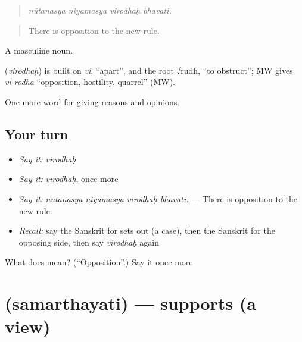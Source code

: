 \begin{quote}
   
\end{quote}

\begin{quote}
\emph{nūtanasya niyamasya virodhaḥ bhavati.}
\end{quote}

\begin{quote}
There is opposition to the new rule.
\end{quote}

A masculine noun.

\begin{cousinweb}
\textbf{} (\emph{virodhaḥ}) is built on \emph{vi}, \textquotedblleft{}apart\textquotedblright{}, and the root √rudh, \textquotedblleft{}to obstruct\textquotedblright{}; MW gives \emph{vi-rodha} \textquotedblleft{}opposition, hostility, quarrel\textquotedblright{} (MW).
\end{cousinweb}

\begin{grammarlens}[title={What you've built}]
One more word for giving reasons and opinions.
\end{grammarlens}

\subsection*{Your turn}
\begin{itemize}
\raggedright
  \item \emph{Say it:} \emph{virodhaḥ}
  \item \emph{Say it:} \emph{virodhaḥ}, once more
  \item \emph{Say it:} \emph{nūtanasya niyamasya virodhaḥ bhavati.} — There is opposition to the new rule.
  \item \emph{Recall:} say the Sanskrit for sets out (a case), then the Sanskrit for the opposing side, then say \emph{virodhaḥ} again
\end{itemize}

\begin{tcolorbox}[breakable,colback=teal!4,colframe=teal!35!black,title={Before you move on}]
What does  mean? (\textquotedblleft{}Opposition\textquotedblright{}.) Say it once more.
\end{tcolorbox}
\section[\texorpdfstring{\sk{समर्थयति} (samarthayati)}{समर्थयति (samarthayati)}]{ (samarthayati) — supports (a view)}

